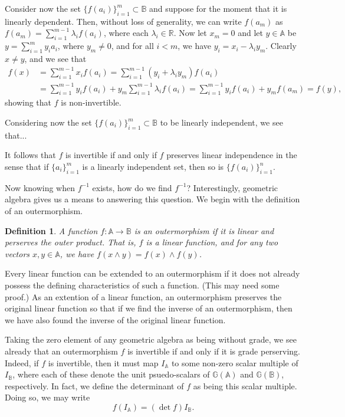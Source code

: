 \documentclass[12pt]{article}
\newcommand{\G}{\mathbb{G}}
\newcommand{\R}{\mathbb{R}}
\newcommand{\A}{\mathbb{A}}
\newcommand{\B}{\mathbb{B}}
\newtheorem{definition}{Definition}[section]
\begin{document}
Consider now the set $\{f(a_i)\}_{i=1}^m\subset\B$ and suppose for the moment that
it is linearly dependent.  Then, without loss of generality, we can write $f(a_m)$
as $f(a_m)=\sum_{i=1}^{m-1}\lambda_i f(a_i)$, where each $\lambda_i\in\R$.
Now let $x_m=0$ and let $y\in\A$ be $y=\sum_{i=1}^m y_i a_i$, where $y_m\neq 0$,
and for all $i<m$, we have $y_i=x_i-\lambda_i y_m$.  Clearly $x\neq y$, and we see that
\begin{align*}
f(x) &= \sum_{i=1}^{m-1} x_if(a_i)
 = \sum_{i=1}^{m-1}(y_i+\lambda_i y_m)f(a_i) \\
 &= \sum_{i=1}^{m-1}y_i f(a_i) + y_m\sum_{i=1}^{m-1}\lambda_i f(a_i)
 = \sum_{i=1}^{m-1}y_i f(a_i) + y_m f(a_m)
 = f(y),
\end{align*}
showing that $f$ is non-invertible.

Considering now the set $\{f(a_i)\}_{i=1}^m\subset\B$ to be linearly independent, we
see that...

 It follows that $f$ is invertible if and only if $f$ preserves linear independence
in the sense that if $\{a_i\}_{i=1}^m$ is a linearly independent set, then so is $\{f(a_i)\}_{i=1}^n$.

Now knowing when $f^{-1}$ exists, how do we find $f^{-1}$?  Interestingly, geometric
algebra gives us a means to answering this question.  We begin with the definition
of an outermorphism.
\begin{definition}
A function $f:\A\to\B$ is an outermorphism if it is linear and perserves the outer product.  That is,
$f$ is a linear function, and for any two vectors $x,y\in\A$, we have $f(x\wedge y)=f(x)\wedge f(y)$.
\end{definition}
Every linear function can be extended to an outermorphism if it does not already possess the
defining characteristics of such a function.  (This may need some proof.)  As an extention of a linear function, an
outermorphism preserves the original linear function so that if we find the inverse of
an outermorphism, then we have also found the inverse of the original linear function.

Taking the zero element of any geometric algebra as being without grade, we see already
that an outermorphism $f$ is invertible if and only if it is grade perserving.  Indeed,
if $f$ is invertible, then it must map $I_{\A}$ to some non-zero scalar multiple of $I_{\B}$,
where each of these denote the unit psuedo-scalars of $\G(\A)$ and $\G(\B)$, respectively.
In fact, we define the determinant of $f$ as being this scalar multiple.  Doing so, we may write
\begin{equation*}
f(I_{\A}) = (\det f)I_{\B}.
\end{equation*}
\end{document}

